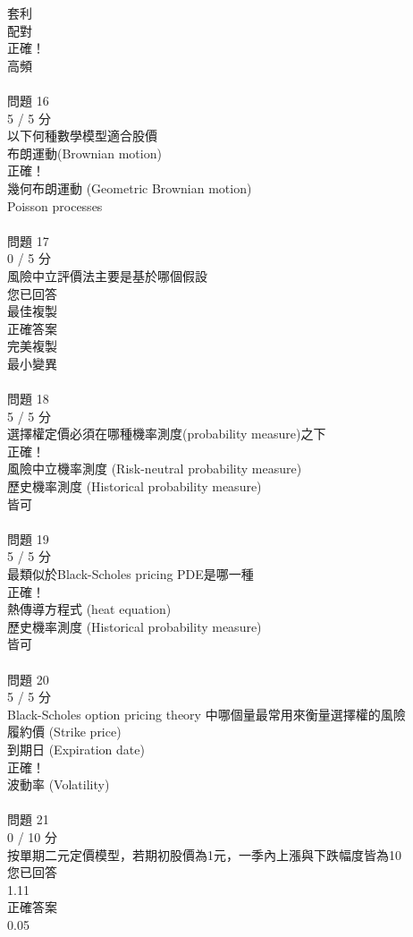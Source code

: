 \begin{multicols}{3}
  套利 \\
  配對 \\
正確！\\
  高頻 \\
 \\
問題 16\\
5 / 5 分\\
以下何種數學模型適合股價\\
  布朗運動(Brownian motion) \\
正確！\\
  幾何布朗運動 (Geometric Brownian motion) \\
  Poisson processes \\
 \\
問題 17\\
0 / 5 分\\
風險中立評價法主要是基於哪個假設\\
您已回答\\
  最佳複製 \\
正確答案\\
  完美複製 \\
  最小變異 \\
 \\
問題 18\\
5 / 5 分\\
選擇權定價必須在哪種機率測度(probability measure)之下\\
正確！\\
  風險中立機率測度 (Risk-neutral probability measure) \\
  歷史機率測度 (Historical probability measure) \\
  皆可 \\
 \\
問題 19\\
5 / 5 分\\
最類似於Black-Scholes pricing PDE是哪一種\\
正確！\\
  熱傳導方程式 (heat equation) \\
  歷史機率測度 (Historical probability measure) \\
  皆可 \\
 \\
問題 20\\
5 / 5 分\\
Black-Scholes option pricing theory 中哪個量最常用來衡量選擇權的風險\\
  履約價 (Strike price) \\
  到期日 (Expiration date) \\
正確！\\
  波動率 (Volatility) \\
 \\
問題 21\\
0 / 10 分\\
按單期二元定價模型，若期初股價為1元，一季內上漲與下跌幅度皆為10%
 \\
您已回答\\
1.11\\
正確答案\\
0.05 \\
\end{multicols}
